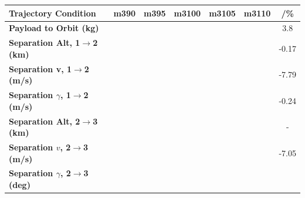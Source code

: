 \begin{table}[ht]
	\centering
	\begin{tabular}{l c c c c c c} 
		\hline \textbf{Trajectory Condition}
		&m390
		&m395
		&m3100
		&m3105
		&m3110
		& /\%
		\\
		\hline \textbf{Payload to Orbit (kg)}
		& \PayloadToOrbitmThreeNinetyNoReturn
		& \PayloadToOrbitmThreeNinetyFiveNoReturn
		& \PayloadToOrbitmThreeStandardNoReturn
		& \PayloadToOrbitmThreeOneHundredFiveNoReturn
		& \PayloadToOrbitmThreeOneHundredTenNoReturn
		&3.8
		\\
		\textbf{Separation Alt, 1$\rightarrow$2 (km)}
		& \firstsecondSeparationAltmThreeNinetyNoReturn
		& \firstsecondSeparationAltmThreeNinetyFiveNoReturn
		& \firstsecondSeparationAltmThreeStandardNoReturn
		& \firstsecondSeparationAltmThreeOneHundredFiveNoReturn
		& \firstsecondSeparationAltmThreeOneHundredTenNoReturn
		&-0.17
		\\
		\textbf{Separation v, 1$\rightarrow$2 (m/s)}
		& \firstsecondSeparationvmThreeNinetyNoReturn
		& \firstsecondSeparationvmThreeNinetyFiveNoReturn
		& \firstsecondSeparationvmThreeStandardNoReturn
		& \firstsecondSeparationvmThreeOneHundredFiveNoReturn
		& \firstsecondSeparationvmThreeOneHundredTenNoReturn
		&-7.79
		\\
		\textbf{Separation $\gamma$, 1$\rightarrow$2 (m/s)}
		& \firstsecondSeparationgammamThreeNinetyNoReturn
		& \firstsecondSeparationgammamThreeNinetyFiveNoReturn
		& \firstsecondSeparationgammamThreeStandardNoReturn
		& \firstsecondSeparationgammamThreeOneHundredFiveNoReturn
		& \firstsecondSeparationgammamThreeOneHundredTenNoReturn
		&-0.24
		\\
		\textbf{Separation Alt, 2$\rightarrow$3 (km)}
		& \secondthirdSeparationAltmThreeNinetyNoReturn
		& \secondthirdSeparationAltmThreeNinetyFiveNoReturn
		& \secondthirdSeparationAltmThreeStandardNoReturn
		& \secondthirdSeparationAltmThreeOneHundredFiveNoReturn
		& \secondthirdSeparationAltmThreeOneHundredTenNoReturn
		& -
		\\
		\textbf{Separation $v$, 2$\rightarrow$3 (m/s)}
		& \secondthirdSeparationvmThreeNinetyNoReturn
		& \secondthirdSeparationvmThreeNinetyFiveNoReturn
		& \secondthirdSeparationvmThreeStandardNoReturn
		& \secondthirdSeparationvmThreeOneHundredFiveNoReturn
		& \secondthirdSeparationvmThreeOneHundredTenNoReturn
		&-7.05
		\\
		\textbf{Separation $\gamma$, 2$\rightarrow$3 (deg)}
		& \secondthirdSeparationgammamThreeNinetyNoReturn
		& \secondthirdSeparationgammamThreeNinetyFiveNoReturn

\end{tabular}
\end{table}
